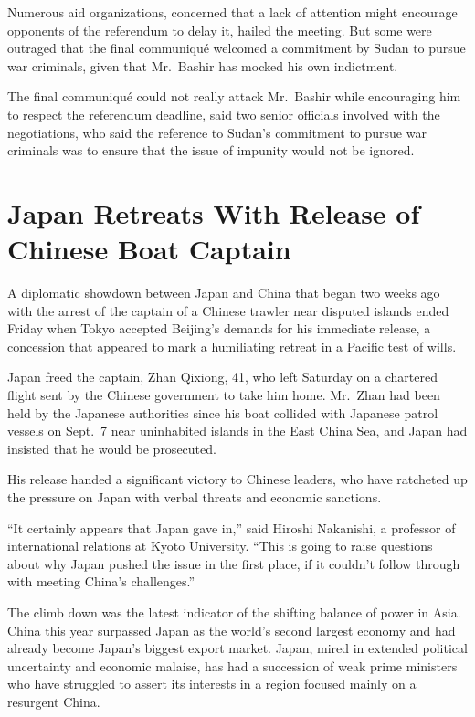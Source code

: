 ﻿\documentclass[12pt]{article}
\begin{document}
Numerous aid organizations, concerned that a lack of attention might encourage opponents of the
referendum to delay it, hailed the meeting. But some were outraged that the final communiqu\'e
welcomed a commitment by Sudan to pursue war criminals, given that Mr.~Bashir has mocked his own
indictment.

The final communiqu\'e could not really attack Mr.~Bashir while encouraging him to respect the
referendum deadline, said two senior officials involved with the negotiations, who said the
reference to Sudan's commitment to pursue war criminals was to ensure that the issue of impunity
would not be ignored.

\pagebreak
\section{Japan Retreats With Release of Chinese Boat Captain}

\lettrine{A}{} diplomatic showdown between Japan and China that began two
weeks ago with the arrest of the captain of a Chinese trawler near disputed islands ended Friday
when Tokyo accepted Beijing's demands for his immediate release, a concession that appeared to mark
a humiliating retreat in a Pacific test of wills.

Japan freed the captain, Zhan Qixiong, 41, who left Saturday on a chartered flight sent by the
Chinese government to take him home. Mr.~Zhan had been held by the Japanese authorities since his
boat collided with Japanese patrol vessels on Sept.~7 near uninhabited islands in the East China
Sea, and Japan had insisted that he would be prosecuted.

His release handed a significant victory to Chinese leaders, who have ratcheted up the pressure on
Japan with verbal threats and economic sanctions.

``It certainly appears that Japan gave in,'' said Hiroshi Nakanishi, a professor of international
relations at Kyoto University. ``This is going to raise questions about why Japan pushed the issue
in the first place, if it couldn't follow through with meeting China's challenges.''

The climb down was the latest indicator of the shifting balance of power in Asia. China this year
surpassed Japan as the world's second largest economy and had already become Japan's biggest export
market. Japan, mired in extended political uncertainty and economic malaise, has had a succession of
weak prime ministers who have struggled to assert its interests in a region focused mainly on a
resurgent China.
\end{document}
